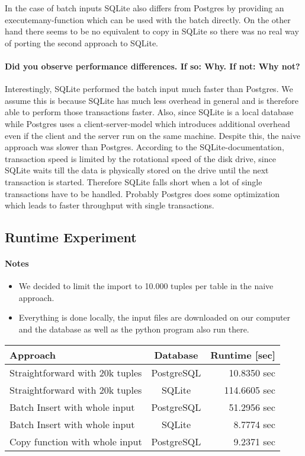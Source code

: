 \documentclass[11pt]{scrartcl}
\begin{document}
In the case of batch inputs SQLite also differs from Postgres by providing an executemany-function which can be used with the batch directly. On the other hand there seems to be no equivalent to copy in SQLite so there was no real way of porting the second approach to SQLite.

\paragraph{Did you observe performance differences. If so: Why. If not: Why not?}

Interestingly, SQLite performed the batch input much faster than Postgres. We assume this is because SQLite has much less overhead in general and is therefore able to perform those transactions faster. Also, since SQLite is a local database while Postgres uses a client-server-model which introduces additional overhead even if the client and the server run on the same machine. Despite this, the naive approach was slower than Postgres. According to the SQLite-documentation, transaction speed is limited by the rotational speed of the disk drive, since SQLite waits till the data is physically stored on the drive until the next transaction is started. Therefore SQLite falls short when a lot of single transactions have to be handled. Probably Postgres does some optimization which leads to faster throughput with single transactions.

\subsection*{Runtime Experiment}

\paragraph{Notes}

\begin{itemize}
  \item We decided to limit the import to 10.000 tuples per table in the naive approach.
  \item Everything is done locally, the input files are downloaded on our computer and the database as well as the python program also run there.
\end{itemize}

\begin{table}[H]
  \centering
  \begin{tabular}{l|c|r}
    Approach & Database & Runtime [sec] \tabularnewline
    \hline
    Straightforward with 20k tuples & PostgreSQL  & 10.8350 sec \tabularnewline
    Straightforward with 20k tuples & SQLite  & 114.6605 sec \tabularnewline
    Batch Insert with whole input & PostgreSQL & 51.2956 sec \tabularnewline
    Batch Insert with whole input & SQLite & 8.7774 sec \tabularnewline
    Copy function with whole input & PostgreSQL & 9.2371 sec \tabularnewline
  \end{tabular}
\end{table}
\end{document}
